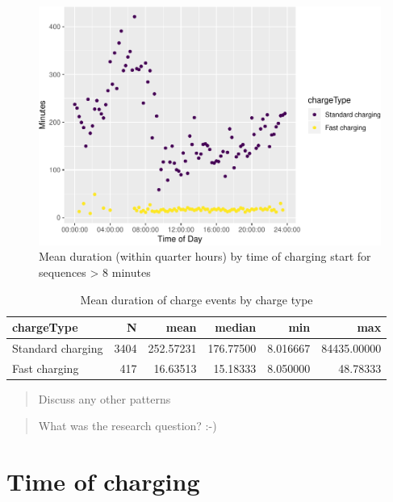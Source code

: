 \documentclass[]{article}
\begin{document}
\begin{figure}
\centering
\includegraphics{EVBB_report_files/figure-latex/durationTimeMean-1.pdf}
\caption{\label{fig:durationTimeMean}Mean duration (within quarter hours) by
time of charging start for sequences \textgreater{} 8 minutes}
\end{figure}

\begin{table}[t]

\caption{\label{tab:meanDurationTable}Mean duration of charge events by charge type}
\centering
\begin{tabular}{l|r|r|r|r|r}
\hline
chargeType & N & mean & median & min & max\\
\hline
Standard charging & 3404 & 252.57231 & 176.77500 & 8.016667 & 84435.00000\\
\hline
Fast charging & 417 & 16.63513 & 15.18333 & 8.050000 & 48.78333\\
\hline
\end{tabular}
\end{table}

\begin{quote}
Discuss any other patterns
\end{quote}

\begin{quote}
What was the research question? :-)
\end{quote}

\section{Time of charging}\label{time-of-charging}
\end{document}
